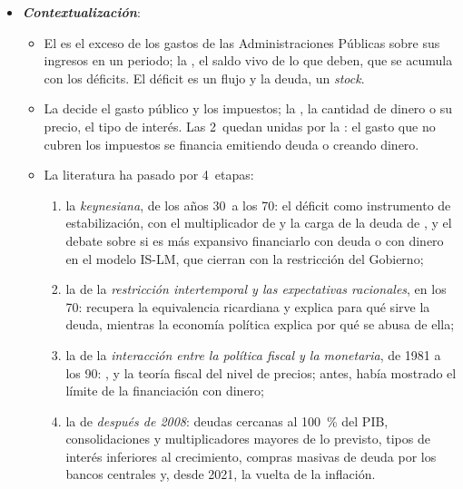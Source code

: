 \documentclass[11pt]{article}
\begin{document}
\begin{itemize}
\item \textbf{\emph{Contextualización}}:
  \begin{itemize}
  \item El  es el exceso de los gastos de las Administraciones Públicas sobre sus ingresos en un periodo; la , el saldo vivo de lo que deben, que se acumula con los déficits. El déficit es un flujo y la deuda, un \emph{stock}.
  \item La  decide el gasto público y los impuestos; la , la cantidad de dinero o su precio, el tipo de interés. Las 2~quedan unidas por la : el gasto que no cubren los impuestos se financia emitiendo deuda o creando dinero.
  \item La literatura ha pasado por 4~etapas:
    \begin{enumerate}
    \item la \emph{keynesiana}, de los años 30~a los 70: el déficit como instrumento de estabilización, con el multiplicador de \textcite{Kahn1931Relation} y la carga de la deuda de \textcite{Domar1944Burden}, y el debate sobre si es más expansivo financiarlo con deuda o con dinero en el modelo IS-LM, que \textcite{BlinderSolow1973Analytical} cierran con la restricción del Gobierno;
    \item la de la \emph{restricción intertemporal y las expectativas racionales}, en los 70: \textcite{Barro1974} recupera la equivalencia ricardiana y \textcite{Barro1979Determination} explica para qué sirve la deuda, mientras la economía política explica por qué se abusa de ella;
    \item la de la \emph{interacción entre la política fiscal y la monetaria}, de 1981 a los 90: \textcite{SargentWallace1981Some}, \textcite{Leeper1991} y la teoría fiscal del nivel de precios\nocite{Sims1994Simple,Woodford1995Price}; antes, \textcite{Cagan1956Monetary} había mostrado el límite de la financiación con dinero;
    \item la de \emph{después de 2008}: deudas cercanas al 100~\% del PIB, consolidaciones y multiplicadores mayores de lo previsto\nocite{BlanchardLeigh2013Growth}, tipos de interés inferiores al crecimiento\nocite{Blanchard2019Deuda}, compras masivas de deuda por los bancos centrales y, desde 2021, la vuelta de la inflación.
    \end{enumerate}
  \end{itemize}


\end{itemize}
\end{document}
